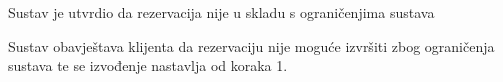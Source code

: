 \begin{packed_item}
\begin{packed_item}
\begin{packed_enum}
							\end{packed_enum}
	
							\item[6.a] Sustav je utvrdio da rezervacija nije u skladu s ograničenjima sustava
							\item[] \begin{packed_enum}
								
								\item Sustav obavještava klijenta da rezervaciju nije moguće izvršiti zbog ograničenja sustava te se izvođenje nastavlja od koraka 1.
								
							\end{packed_enum}
							
								
							
							
						\end{packed_item}
					\end{packed_item}
					\noindent {}
